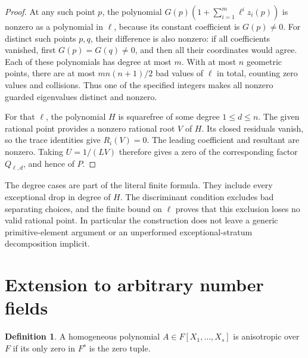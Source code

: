 \documentclass[11pt,a4paper]{article}
\theoremstyle{definition}
\newtheorem{definition}[theorem]{Definition}
\theoremstyle{remark}
\begin{document}
\begin{proof}
At any such point $p$, the polynomial
$G(p)(1+\sum_{i=1}^m\ell^i z_i(p))$ is nonzero as a polynomial
in $\ell$, because its constant coefficient is $G(p)\ne0$.
For distinct such points $p,q$, their difference is also nonzero:
if all coefficients vanished, first $G(p)=G(q)\ne0$, and then
all their coordinates would agree. Each of these polynomials has
degree at most $m$. With at most $n$ geometric points, there are
at most $m n(n+1)/2$ bad values of $\ell$ in total, counting zero
values and collisions. Thus one of the specified integers makes
all nonzero guarded eigenvalues distinct and nonzero.

For that $\ell$, the polynomial $H$ is squarefree of some degree
$1\le d\le n$. The given rational point provides a nonzero
rational root $V$ of $H$. Its closed residuals vanish, so the trace
identities give $R_i(V)=0$. The leading coefficient and resultant
are nonzero. Taking $U=1/(LV)$ therefore gives a zero of the
corresponding factor $Q_{\ell,d}$, and hence of $P$.
\end{proof}

The degree cases are part of the literal finite formula. They include
every exceptional drop in degree of $H$. The discriminant condition
excludes bad separating choices, and the finite bound on $\ell$ proves
that this exclusion loses no valid rational point. In particular the
construction does not leave a generic primitive-element argument or an
unperformed exceptional-stratum decomposition implicit.


\section{Extension to arbitrary number fields}
\begin{definition}
A homogeneous polynomial $A\in F[X_1,\ldots,X_s]$ is anisotropic
over $F$ if its only zero in $F^s$ is the zero tuple.
\end{definition}
\end{document}
